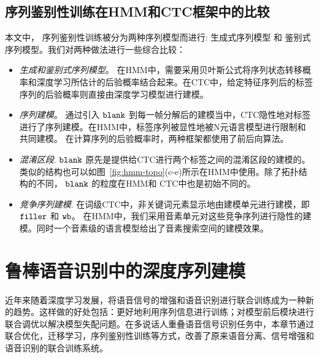 \subsection{序列鉴别性训练在HMM和CTC框架中的比较}
\label{Sec:disc-and-ctc}

本文中， 序列鉴别性训练被分为两种序列模型而进行: 生成式序列模型 和 鉴别式序列模型。我们对两种做法进行一些综合比较：

\begin{itemize}
  \item {\em 生成和鉴别式序列模型}。 在HMM中，需要采用贝叶斯公式将序列状态转移概率和深度学习所估计的后验概率结合起来。在CTC中，给定特征序列后的标签序列的后验概率则直接由深度学习模型进行建模。
  \item {\em 序列建模}。 通过引入 $\tt{blank}$ 到每一帧分解后的建模当中，CTC隐性地对标签进行了序列建模。在HMM中，标签序列被显性地被N元语言模型进行限制和共同建模。
  在计算序列的后验概率时，两种框架都使用了前后向算法。
  \item {\em 混淆区段}. $\tt{blank}$ 原先是提供给CTC进行两个标签之间的混淆区段的建模的。类似的结构也可以如图~\ref{fig:hmm-topo}(c-e)所示在HMM中使用。除了拓扑结构的不同， $\tt blank$ 的粒度在HMM和 CTC中也是初始不同的。
  \item {\em 竞争序列建模}. 在词级CTC中，非关键词元素显示地由建模单元进行建模，即 $\tt filler$ 和 $\tt wb$。 在HMM中，我们采用音素单元对这些竞争序列进行隐性的建模。同时一个音素级的语言模型给出了音素搜索空间的建模效果。 %
\end{itemize}


\section{鲁棒语音识别中的深度序列建模}
\label{chap:intro2-pit}

近年来随着深度学习发展，将语音信号的增强和语音识别进行联合训练成为一种新的趋势。这样做的好处包括：更好地利用序列信息进行训练；对模型前后模块进行联合调优以解决模型失配问题。在多说话人重叠语音信号识别任务中，本章节通过联合优化，迁移学习，序列鉴别性训练等方式，改善了原来语音分离、信号增强和语音识别的联合训练系统。


